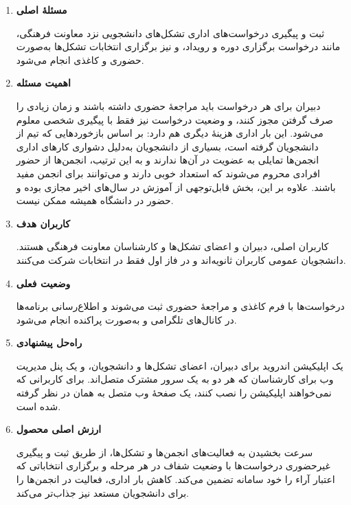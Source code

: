 \documentclass[a4paper,12pt]{article}
\newcommand{\engr}[1]{\textcolor{engred}{\lr{#1}}}
\newcommand{\q}[1]{\textcolor{brand}{\textbf{#1}}\par}
\begin{document}
\begin{enumerate}
        \vspace*{0.5cm}
	\item \q{مسئلهٔ اصلی}
	ثبت و پیگیری درخواست‌های اداری تشکل‌های دانشجویی نزد معاونت فرهنگی، مانند درخواست برگزاری دوره و رویداد، و نیز برگزاری انتخابات تشکل‌ها به‌صورت حضوری و کاغذی انجام می‌شود.

        \vspace*{0.5cm}
	\item \q{اهمیت مسئله}
	دبیران برای هر درخواست باید مراجعهٔ حضوری داشته باشند و زمان زیادی را صرف گرفتن مجوز کنند، و وضعیت درخواست نیز فقط با پیگیری شخصی معلوم می‌شود. این بار اداری هزینهٔ دیگری هم دارد: بر اساس بازخوردهایی که تیم از دانشجویان گرفته است، بسیاری از دانشجویان به‌دلیل دشواری کارهای اداری انجمن‌ها تمایلی به عضویت در آن‌ها ندارند و به این ترتیب، انجمن‌ها از حضور افرادی محروم می‌شوند که استعداد خوبی دارند و می‌توانند برای انجمن مفید باشند. علاوه بر این، بخش قابل‌توجهی از آموزش در سال‌های اخیر مجازی بوده و حضور در دانشگاه همیشه ممکن نیست.

        \vspace*{0.5cm}
	\item \q{کاربران هدف}
	کاربران اصلی، دبیران و اعضای تشکل‌ها و کارشناسان معاونت فرهنگی هستند. دانشجویان عمومی کاربران ثانویه‌اند و در فاز اول فقط در انتخابات شرکت می‌کنند.

        \vspace*{0.5cm}
	\item \q{وضعیت فعلی}
	درخواست‌ها با فرم کاغذی و مراجعهٔ حضوری ثبت می‌شوند و اطلاع‌رسانی برنامه‌ها در کانال‌های تلگرامی و به‌صورت پراکنده انجام می‌شود.

        \vspace*{0.5cm}
	\item \q{راه‌حل پیشنهادی}
	یک اپلیکیشن اندروید برای دبیران، اعضای تشکل‌ها و دانشجویان، و یک پنل مدیریت وب برای کارشناسان که هر دو به یک سرور مشترک متصل‌اند. برای کاربرانی که نمی‌خواهند اپلیکیشن را نصب کنند، یک صفحهٔ وب متصل به همان \engr{API} در نظر گرفته شده است.

        \vspace*{0.5cm}
	\item \q{ارزش اصلی محصول}
	سرعت بخشیدن به فعالیت‌های انجمن‌ها و تشکل‌ها، از طریق ثبت و پیگیری غیرحضوری درخواست‌ها با وضعیت شفاف در هر مرحله و برگزاری انتخاباتی که اعتبار آراء را خود سامانه تضمین می‌کند. کاهش بار اداری، فعالیت در انجمن‌ها را برای دانشجویان مستعد نیز جذاب‌تر می‌کند.


\end{enumerate}
\end{document}
